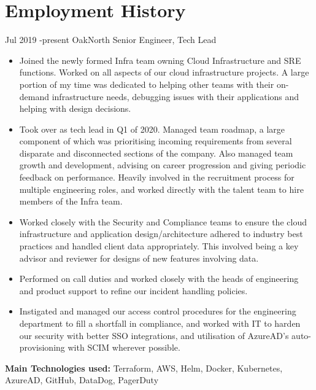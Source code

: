 \documentclass[10pt]{article} %
\begin{document}
\section{Employment History}

\jobheader
{Jul 2019 -}{present}
{OakNorth}
{Senior Engineer, Tech Lead}
\vspace{-1cm}
  \begin{itemize}

  \item Joined the newly formed Infra team owning Cloud Infrastructure and SRE functions.
        Worked on all aspects of our cloud infrastructure projects.
        A large portion of my time was dedicated to helping other teams with their on-demand infrastructure needs,
        debugging issues with their applications and helping with design decisions.

  \item Took over as tech lead in Q1 of 2020. Managed team roadmap, a large component
        of which was prioritising incoming requirements from several disparate and disconnected
        sections of the company. Also managed team growth and development, advising on career
        progression and giving periodic feedback on performance. Heavily involved in
        the recruitment process for multiple engineering roles, and worked directly with the talent
        team to hire members of the Infra team.

  \item Worked closely with the Security and Compliance teams to ensure
        the cloud infrastructure and application design/architecture adhered to industry
        best practices and handled client data appropriately. This involved being a key
        advisor and reviewer for designs of new features involving data.

  \item Performed on call duties and worked closely with the heads of engineering and product support
        to refine our incident handling policies.

  \item Instigated and managed our access control procedures for the engineering department
        to fill a shortfall in compliance, and worked with IT to harden our security
        with better SSO integrations, and utilisation of AzureAD's auto-provisioning
        with SCIM wherever possible.

  \end{itemize}

  \textbf{Main Technologies used:}
  Terraform, AWS, Helm, Docker, Kubernetes, AzureAD, GitHub, DataDog, PagerDuty
\end{document}
